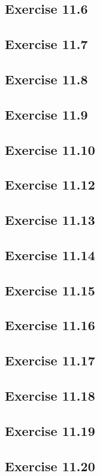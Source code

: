 \documentclass[a4paper,12pt]{article}
\begin{document}
\subsection*{Exercise 11.6}

\subsection*{Exercise 11.7}
\subsection*{Exercise 11.8}
\subsection*{Exercise 11.9}
\subsection*{Exercise 11.10}
\subsection*{Exercise 11.12}
\subsection*{Exercise 11.13}
\subsection*{Exercise 11.14}
\subsection*{Exercise 11.15}
\subsection*{Exercise 11.16}
\subsection*{Exercise 11.17}
\subsection*{Exercise 11.18}
\subsection*{Exercise 11.19}
\subsection*{Exercise 11.20}
\end{document}
